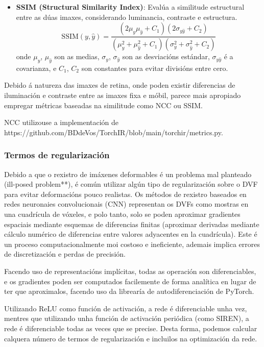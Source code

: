 \begin{itemize}
    \item \textbf{SSIM (Structural Similarity Index)}:
    Evalúa a similitude estructural entre as dúas imaxes, considerando luminancia, contraste e estructura.
    \[
    \text{SSIM}(y, \hat{y}) = \frac{(2\mu_y\mu_{\hat{y}} + C_1)(2\sigma_{y\hat{y}} + C_2)}{(\mu_y^2 + \mu_{\hat{y}}^2 + C_1)(\sigma_y^2 + \sigma_{\hat{y}}^2 + C_2)}
    \]
    onde \( \mu_y \), \( \mu_{\hat{y}} \) son as medias, \( \sigma_y \), \( \sigma_{\hat{y}} \) son as desviacións estándar, \( \sigma_{y\hat{y}} \) é a covarianza, e \( C_1 \), \( C_2 \) son constantes para evitar divisións entre cero. \cite{Palubinskas02012017}
\end{itemize}

Debido á natureza das imaxes de retina, onde poden existir diferencias de iluminación e contraste entre as imaxes fixa e móbil, 
parece mais apropiado empregar métricas baseadas na similitude como NCC ou SSIM.

NCC utilizouse a implementación de  https://github.com/BDdeVos/TorchIR/blob/main/torchir/metrics.py.

\subsubsection{Termos de regularización}
\label{subsubsec:Termos de regularización}

Debido a que o rexistro de imáxenes deformables é un problema mal planteado (ill-posed problem**), 
é común utilizar algún tipo de regularización sobre o DVF para evitar deformacións pouco realistas.
 Os métodos de rexistro baseados en redes neuronaies convolucionais (CNN) representan os DVFs
 como mostras en una cuadrícula de vóxeles, e polo tanto, solo se poden aproximar gradientes espaciais
 mediante esquemas de diferencias finitas (aproximar derivadas mediante cálculo numérico de diferencias entre valores adyacentes en la cuadrícula).
 Este é un proceso computacionalmente moi costoso e ineficiente, ademais implica errores de discretización e perdas de precisión.


Facendo uso de representacións implícitas, todas as operación son diferenciables, e os gradientes poden
 ser computados facilemente de forma analítica en lugar de ter que aproximalos, facendo uso da librearía de autodiferenciación de PyTorch.

Utilizando ReLU como función de activación, a rede é diferenciable unha vez, mentres que utilizando
 unha función de activación periódica (como SIREN), a rede é diferenciable todas as veces que se precise.
Desta forma, podemos calcular calquera número de termos de regularización e incluilos na optimización da rede.

